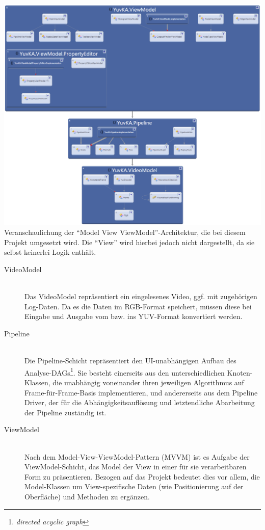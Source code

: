 \includegraphics[width=\textwidth]{Diagrams/namespacedependencies.png}
Veranschaulichung der ``Model View ViewModel''-Architektur, die bei diesem Projekt umgesetzt wird. Die ``View'' wird hierbei jedoch nicht dargestellt, da sie selbst keinerlei Logik enthält.
\begin{description}
	\item[VideoModel]~\\
	Das VideoModel repräsentiert ein eingelesenes Video, ggf. mit zugehörigen Log-Daten. Da es die Daten im RGB-Format speichert, müssen diese bei Eingabe und Ausgabe vom bzw. ins YUV-Format konvertiert
werden.

	\item[Pipeline]~\\
	Die Pipeline-Schicht repräsentiert den UI-unabhängigen Aufbau des Analyse-DAGs\footnote{\emph{directed acyclic graph}}. Sie besteht einerseits aus den unterschiedlichen Knoten-Klassen, die unabhängig voneinander ihren jeweiligen Algorithmus auf Frame-für-Frame-Basis implementieren, und andererseits aus dem Pipeline Driver, der für die Abhängigkeitsauflösung und letztendliche Abarbeitung der Pipeline zuständig ist.
	
	\item[ViewModel]~\\
	Nach dem Model-View-ViewModel-Pattern (MVVM) ist es Aufgabe der ViewModel-Schicht, das Model der View in einer für sie verarbeitbaren Form zu präsentieren. Bezogen auf das Projekt bedeutet dies vor allem, die Model-Klassen um View-spezifische Daten (wie Positionierung auf der Oberfläche) und Methoden zu ergänzen.

\end{description}



